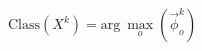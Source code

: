 \documentclass[border=5]{standalone}
\begin{document}
$\text{Class}(X^k)=\mathrm{arg}~\max\limits_{o}(\vec{\phi}_o^k) $
\end{document}
